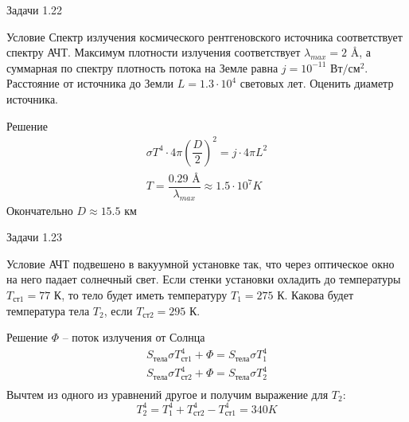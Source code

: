 \documentclass[12]{beamer}
\begin{document}
\begin{frame}{Задачи 1.22}\scriptsize
\begin{block}{Условие}
Спектр излучения космического рентгеновского источника соответствует спектру АЧТ. Максимум плотности излучения соответствует $\lambda_{max} = 2$ \AA, а суммарная по спектру плотность потока на Земле равна $j = 10^{-11} \text{ Вт}/\text{см}^2$. Расстояние от источника до Земли $L = 1.3\cdot 10^4$ световых лет. Оценить диаметр источника. 
\end{block}
\begin{block}{Решение}
\begin{gather*}
    \sigma T^4 \cdot 4\pi\left( \dfrac{D}{2}\right)^2 = j\cdot4\pi L^2 \\
    T = \dfrac{0.29 \text{ \AA}}{\lambda_{max}} \approx 1.5 \cdot 10^7 K
\end{gather*}
Окончательно $D\approx15.5$ км
\end{block}
    
\end{frame}

\begin{frame}{Задачи 1.23}\scriptsize
\begin{block}{Условие}
АЧТ подвешено в вакуумной установке так, что через оптическое окно на него падает солнечный свет. Если стенки установки охладить до температуры $T_{\text{ст1}} = 77 $ К, то тело будет иметь температуру $T_{1} = 275 $ К. Какова будет температура тела $T_2$, если $T_{\text{ст2}} = 295 $ К.
\end{block}
\begin{block}{Решение}
$\Phi$ -- поток излучения от Солнца 
\begin{gather*}
    S_{\text{тела}}\sigma T^4_{\text{ст1}} + \Phi = S_{\text{тела}}\sigma T^4_1\\
    S_{\text{тела}}\sigma T^4_{\text{ст2}} + \Phi = S_{\text{тела}}\sigma T^4_2\\
\end{gather*}
Вычтем из одного из уравнений другое и получим выражение для $T_2$:
\begin{equation*}
    T_2^4 = T_1^4 + T^4_{\text{ст2}} - T^4_{\text{ст1}} = 340 K
\end{equation*}
\end{block}
    
\end{frame}
\end{document}
